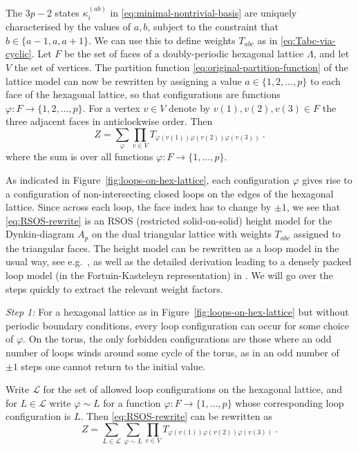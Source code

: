 \documentclass[11pt,a4paper]{article}
\numberwithin{equation}{section}
\begin{document}
The $3p-2$ states $\kappa^{(ab)}_i$ in \eqref{eq:minimal-nontrivial-basis} are uniquely characterised by the values of $a,b$, subject to the constraint that $b \in \{a-1,a,a+1\}$. 
We can use this to define weights $T_{abc}$ as in \eqref{eq:Tabc-via-cyclic}.
Let $F$ be the set of faces of a doubly-periodic hexagonal lattice $\Lambda$, and let $V$ the set of vertices.
The partition function \eqref{eq:original-partition-function} of the lattice model can now be rewritten by assigning a value $a \in \{1,2,\dots,p\}$ to each face of the hexagonal lattice, so that configurations are functions $\varphi : F \to \{1,2,\dots,p\}$. For a vertex $v \in V$ denote by  $v(1),v(2),v(3) \in F$ the three adjacent faces in anticlockwise order. Then
\begin{equation}\label{eq:RSOS-rewrite}
    Z = \sum_{\varphi} \prod_{v \in V} T_{\varphi(v(1))\varphi(v(2))\varphi(v(3))} ~.
\end{equation}
where the sum is over all functions $\varphi : F \to \{1,\dots,p\}$.

As indicated in Figure~\ref{fig:loops-on-hex-lattice}, each configuration $\varphi$ gives rise to a configuration of non-intersecting closed loops on the edges of the hexagonal lattice. Since across each loop, the face index has to change by $\pm 1$, we see that \eqref{eq:RSOS-rewrite} is an RSOS (restricted solid-on-solid) height model for the Dynkin-diagram $A_p$ on the dual triangular lattice with weights $T_{abc}$ assigned to the triangular faces.
The height model can be rewritten as a loop model in the usual way, see e.g.\ \cite{Nienhuis:1982fx,Pasquier:1987,Cardy:2006yt}, as well as the detailed derivation leading to a densely packed loop model (in the Fortuin-Kasteleyn representation) in \cite[App.\,A]{He:2020mhb}.
We will go over the steps quickly to extract the relevant weight factors.

\medskip

\noindent
\textit{Step 1:} For a hexagonal lattice as in Figure~\ref{fig:loops-on-hex-lattice} but without periodic boundary conditions, every loop configuration can occur for some choice of $\varphi$. On the torus, the only forbidden configurations are those where an odd number of loops winds around some cycle of the torus, as in an odd number of $\pm1$ steps one cannot return to the initial value.

Write $\mathcal{L}$ for the set of allowed loop configurations on the hexagonal lattice, and for $L \in \mathcal{L}$ write $\varphi\sim L$ for a function $\varphi : F \to \{1,\dots,p\}$ whose corresponding loop configuration is $L$. Then \eqref{eq:RSOS-rewrite} can be rewritten as
\begin{equation}\label{eq:RSOS-rewrite-loop}
    Z = \sum_{L \in \mathcal{L}} \sum_{\varphi \sim L} \prod_{v \in V} T_{\varphi(v(1))\varphi(v(2))\varphi(v(3))} ~.
\end{equation}
\end{document}
